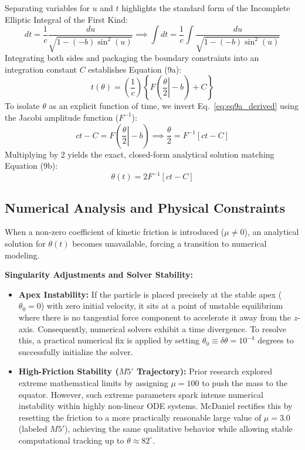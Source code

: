 \documentclass[11pt,letterpaper]{article}
\begin{document}
Separating variables for $u$ and $t$ highlights the standard form of the Incomplete Elliptic Integral of the First Kind:
\begin{equation*}
dt = \frac{1}{c}\frac{du}{\sqrt{1 - (-b)\sin^2(u)}} \implies \int dt = \frac{1}{c} \int \frac{du}{\sqrt{1 - (-b)\sin^2(u)}}
\end{equation*}
Integrating both sides and packaging the boundary constraints into an integration constant $C$ establishes Equation (9a):
\begin{equation}\label{eq:eq9a_derived}
t(\theta) = \left(\frac{1}{c}\right)\left\{ F\left(\left.\frac{\theta}{2}\right| -b\right) + C\right\}
\end{equation}
To isolate $\theta$ as an explicit function of time, we invert Eq.~\eqref{eq:eq9a_derived} using the Jacobi amplitude function ($F^{-1}$):
\begin{equation*}
ct - C = F\left(\left.\frac{\theta}{2}\right| -b\right) \implies \frac{\theta}{2} = F^{-1}[ct - C]
\end{equation*}
Multiplying by 2 yields the exact, closed-form analytical solution matching Equation (9b):
\begin{equation}\label{eq:eq9b_derived}
\theta(t) = 2F^{-1}[ct - C]
\end{equation}

\subsection{Numerical Analysis and Physical Constraints}
When a non-zero coefficient of kinetic friction is introduced ($\mu \neq 0$), an analytical solution for $\theta(t)$ becomes unavailable, forcing a transition to numerical modeling. 

\begin{physicsinsight}
\textbf{Singularity Adjustments and Solver Stability:}
\begin{itemize}
    \item \textbf{Apex Instability:} If the particle is placed precisely at the stable apex ($\theta_0 = 0$) with zero initial velocity, it sits at a point of unstable equilibrium where there is no tangential force component to accelerate it away from the $z$-axis. Consequently, numerical solvers exhibit a time divergence. To resolve this, a practical numerical fix is applied by setting $\theta_0 \equiv \delta\theta = 10^{-4}$ degrees to successfully initialize the solver.
    \item \textbf{High-Friction Stability ($M5'$ Trajectory):} Prior research explored extreme mathematical limits by assigning $\mu = 100$ to push the mass to the equator. However, such extreme parameters spark intense numerical instability within highly non-linear ODE systems. McDaniel rectifies this by resetting the friction to a more practically reasonable large value of $\mu = 3.0$ (labeled $M5'$), achieving the same qualitative behavior while allowing stable computational tracking up to $\theta \approx 82^\circ$.
\end{itemize}
\end{physicsinsight}
\end{document}
